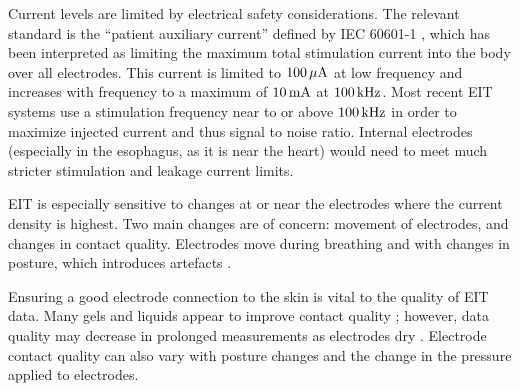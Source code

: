 \documentclass[12pt]{article} \usepackage[margin=3cm]{geometry} \usepackage[margin=20pt,font=small,labelfont=bf]{caption}\def\TBLWIDA{35mm}\def\TBLWIDB{95mm}
\begin{document}
Current levels are limited by electrical safety considerations.
The relevant standard is the ``patient auxiliary current''
defined by IEC 60601-1 \cite{IEC60601}, which has been interpreted
as limiting the maximum total stimulation current into the body over all
electrodes. 
This current is limited to $\rm 100\,\mu A$ at low frequency
and increases with frequency to a maximum of $\rm 10\,mA$ at $\rm 100\,kHz$.
Most recent EIT systems use a stimulation frequency 
near to or above $\rm 100\,kHz$ in order to maximize
injected current and thus signal to noise ratio.
Internal electrodes \cite{Schuessler1995Esophageal}
(especially in the esophagus, as it is near the heart)
would need to meet much stricter stimulation and leakage current limits.


EIT is especially sensitive to changes at or near the electrodes
where the current density is highest. Two main changes are of
concern: movement of electrodes, and changes in contact quality.
Electrodes move during breathing and with changes in posture,
which introduces artefacts \cite{Adler1996Expansion}.

Ensuring a good electrode connection to the skin is vital to 
the quality of EIT data. Many gels and liquids appear to
improve contact quality \cite{Waldmann2017Interface};
however, data quality may decrease in prolonged measurements 
as electrodes dry \cite{Lozano1995Prolonged}.
Electrode contact quality can also vary with
posture changes \cite{Coulombe2005Parametric} and the change in the
pressure applied to electrodes.
\end{document}
